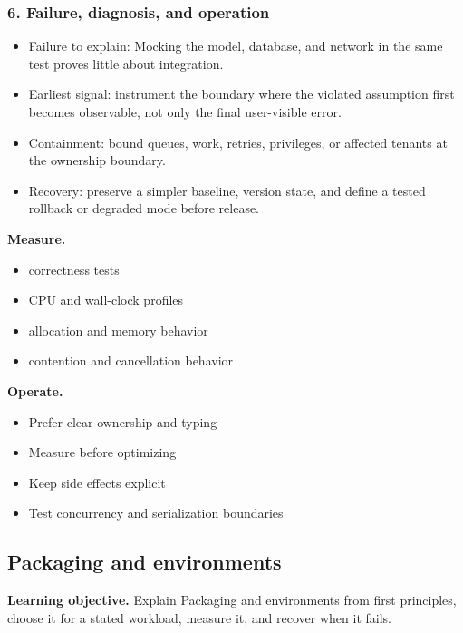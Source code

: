 \subsubsection*{6. Failure, diagnosis, and operation}
\begin{itemize}
\item Failure to explain: Mocking the model, database, and network in the same test proves little about integration.
\item Earliest signal: instrument the boundary where the violated assumption first becomes observable, not only the final user-visible error.
\item Containment: bound queues, work, retries, privileges, or affected tenants at the ownership boundary.
\item Recovery: preserve a simpler baseline, version state, and define a tested rollback or degraded mode before release.
\end{itemize}
\textbf{Measure.}\begin{itemize}
\item correctness tests
\item CPU and wall-clock profiles
\item allocation and memory behavior
\item contention and cancellation behavior
\end{itemize}
\textbf{Operate.}\begin{itemize}
\item Prefer clear ownership and typing
\item Measure before optimizing
\item Keep side effects explicit
\item Test concurrency and serialization boundaries
\end{itemize}
\subsection{Packaging and environments}
\textbf{Learning objective.} Explain Packaging and environments from first principles, choose it for a stated workload, measure it, and recover when it fails.

